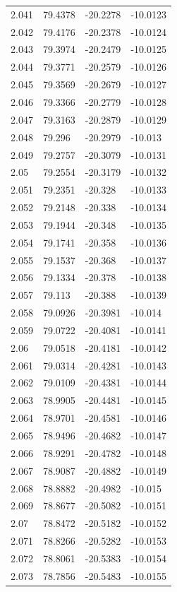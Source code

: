 \begin{tabular}{llll}
2.041 & 79.4378 & -20.2278 & -10.0123 \\
2.042 & 79.4176 & -20.2378 & -10.0124 \\
2.043 & 79.3974 & -20.2479 & -10.0125 \\
2.044 & 79.3771 & -20.2579 & -10.0126 \\
2.045 & 79.3569 & -20.2679 & -10.0127 \\
2.046 & 79.3366 & -20.2779 & -10.0128 \\
2.047 & 79.3163 & -20.2879 & -10.0129 \\
2.048 & 79.296 & -20.2979 & -10.013 \\
2.049 & 79.2757 & -20.3079 & -10.0131 \\
2.05 & 79.2554 & -20.3179 & -10.0132 \\
2.051 & 79.2351 & -20.328 & -10.0133 \\
2.052 & 79.2148 & -20.338 & -10.0134 \\
2.053 & 79.1944 & -20.348 & -10.0135 \\
2.054 & 79.1741 & -20.358 & -10.0136 \\
2.055 & 79.1537 & -20.368 & -10.0137 \\
2.056 & 79.1334 & -20.378 & -10.0138 \\
2.057 & 79.113 & -20.388 & -10.0139 \\
2.058 & 79.0926 & -20.3981 & -10.014 \\
2.059 & 79.0722 & -20.4081 & -10.0141 \\
2.06 & 79.0518 & -20.4181 & -10.0142 \\
2.061 & 79.0314 & -20.4281 & -10.0143 \\
2.062 & 79.0109 & -20.4381 & -10.0144 \\
2.063 & 78.9905 & -20.4481 & -10.0145 \\
2.064 & 78.9701 & -20.4581 & -10.0146 \\
2.065 & 78.9496 & -20.4682 & -10.0147 \\
2.066 & 78.9291 & -20.4782 & -10.0148 \\
2.067 & 78.9087 & -20.4882 & -10.0149 \\
2.068 & 78.8882 & -20.4982 & -10.015 \\
2.069 & 78.8677 & -20.5082 & -10.0151 \\
2.07 & 78.8472 & -20.5182 & -10.0152 \\
2.071 & 78.8266 & -20.5282 & -10.0153 \\
2.072 & 78.8061 & -20.5383 & -10.0154 \\
2.073 & 78.7856 & -20.5483 & -10.0155 \\

\end{tabular}

